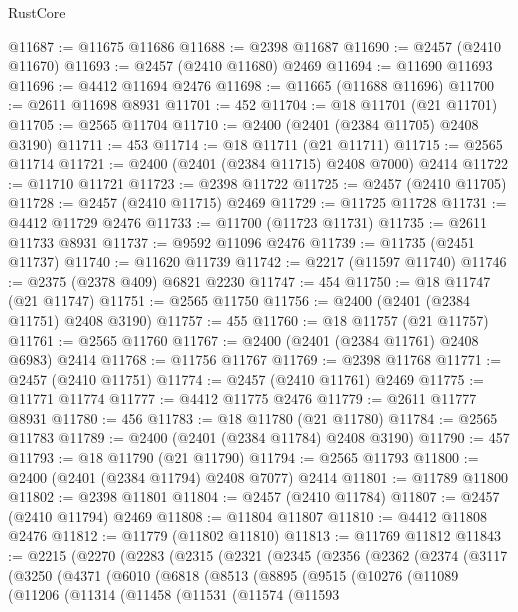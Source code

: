 \begin{lexlean}{RustCore}
\begin{coremodule}
@11687 := @11675 @11686
@11688 := @2398 @11687
@11690 := @2457 (@2410 @11670)
@11693 := @2457 (@2410 @11680) @2469
@11694 := @11690 @11693
@11696 := @4412 @11694 @2476
@11698 := @11665 (@11688 @11696)
@11700 := @2611 @11698 @8931
@11701 := 452
@11704 := @18 @11701 (@21 @11701)
@11705 := @2565 @11704
@11710 := @2400 (@2401 (@2384 @11705) @2408 @3190)
@11711 := 453
@11714 := @18 @11711 (@21 @11711)
@11715 := @2565 @11714
@11721 := @2400 (@2401 (@2384 @11715) @2408 @7000) @2414
@11722 := @11710 @11721
@11723 := @2398 @11722
@11725 := @2457 (@2410 @11705)
@11728 := @2457 (@2410 @11715) @2469
@11729 := @11725 @11728
@11731 := @4412 @11729 @2476
@11733 := @11700 (@11723 @11731)
@11735 := @2611 @11733 @8931
@11737 := @9592 @11096 @2476
@11739 := @11735 (@2451 @11737)
@11740 := @11620 @11739
@11742 := @2217 (@11597 @11740)
@11746 := @2375 (@2378 @409) @6821 @2230
@11747 := 454
@11750 := @18 @11747 (@21 @11747)
@11751 := @2565 @11750
@11756 := @2400 (@2401 (@2384 @11751) @2408 @3190)
@11757 := 455
@11760 := @18 @11757 (@21 @11757)
@11761 := @2565 @11760
@11767 := @2400 (@2401 (@2384 @11761) @2408 @6983) @2414
@11768 := @11756 @11767
@11769 := @2398 @11768
@11771 := @2457 (@2410 @11751)
@11774 := @2457 (@2410 @11761) @2469
@11775 := @11771 @11774
@11777 := @4412 @11775 @2476
@11779 := @2611 @11777 @8931
@11780 := 456
@11783 := @18 @11780 (@21 @11780)
@11784 := @2565 @11783
@11789 := @2400 (@2401 (@2384 @11784) @2408 @3190)
@11790 := 457
@11793 := @18 @11790 (@21 @11790)
@11794 := @2565 @11793
@11800 := @2400 (@2401 (@2384 @11794) @2408 @7077) @2414
@11801 := @11789 @11800
@11802 := @2398 @11801
@11804 := @2457 (@2410 @11784)
@11807 := @2457 (@2410 @11794) @2469
@11808 := @11804 @11807
@11810 := @4412 @11808 @2476
@11812 := @11779 (@11802 @11810)
@11813 := @11769 @11812
@11843 := @2215
    (@2270
      (@2283
        (@2315
          (@2321
            (@2345
              (@2356
                (@2362
                  (@2374
                    (@3117
                      (@3250
                        (@4371
                          (@6010
                            (@6818
                              (@8513
                                (@8895
                                  (@9515
                                    (@10276
                                      (@11089
                                        (@11206
                                          (@11314
                                            (@11458
                                              (@11531
                                                (@11574
                                                  (@11593

\end{coremodule}
\end{lexlean}
